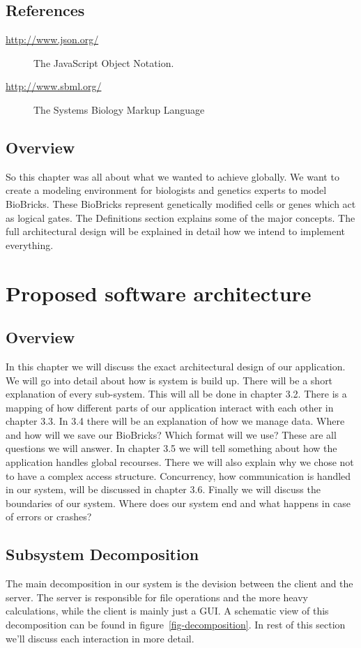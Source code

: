 \documentclass[a4paper]{article}
\begin{document}
\subsection{References}
\begin{description}
	\item[\url{http://www.json.org/}] The JavaScript Object Notation.
	\item[\url{http://www.sbml.org/}] The Systems Biology Markup Language
\end{description}

\subsection{Overview}
So this chapter was all about what we wanted to achieve globally. We want to create a modeling environment for biologists and genetics experts to model BioBricks. These BioBricks represent genetically modified cells or genes which act as logical gates. The Definitions section explains some of the major concepts. The full architectural design will be explained in detail how we intend to implement everything.

\section{Proposed software architecture}
\subsection{Overview}
In this chapter we will discuss the exact architectural design of our application. We will go into detail about how is system is build up. There will be a short explanation of every sub-system. This will all be done in chapter 3.2. There is a mapping of how different parts of our application interact with each other in chapter 3.3. In 3.4 there will be an explanation of how we manage data. Where and how will we save our BioBricks? Which format will we use? These are all questions we will answer. In chapter 3.5 we will tell something about how the application handles global recourses. There we will also explain why we chose not to have a complex access structure. Concurrency, how communication is handled in our system, will be discussed in chapter 3.6. Finally we will discuss the boundaries of our system. Where does our system end and what happens in case of errors or crashes? 

\subsection{Subsystem Decomposition}
The main decomposition in our system is the devision between the client and the server. The server is responsible for file operations and the more heavy calculations, while the client is mainly just a GUI. A schematic view of this decomposition can be found in figure~\ref{fig-decomposition}. In rest of this section we'll discuss each interaction in more detail.
\end{document}
